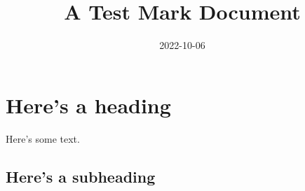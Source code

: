 \documentclass{article}
\title{A Test Mark Document}
\date{2022-10-06}
\begin{document}
\maketitle


\section{Here's a heading}
Here's some text.

\subsection{Here's a subheading}
\end{document}

